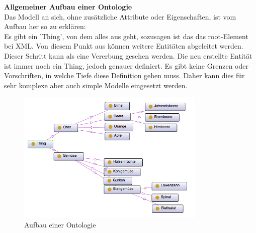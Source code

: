 \textbf{Allgemeiner Aufbau einer Ontologie}\\
Das Modell an sich, ohne zusätzliche Attribute oder Eigenschaften, ist vom Aufbau her so zu erklären:\\
Es gibt ein 'Thing', von dem alles aus geht, sozusagen ist das das root-Element bei \ac{XML}. Von diesem Punkt aus können weitere Entitäten abgeleitet werden. Dieser Schritt kann als eine Vererbung gesehen werden. Die neu erstellte Entität ist immer noch ein Thing, jedoch genauer definiert. Es gibt keine Grenzen oder Vorschriften, in welche Tiefe diese Definition gehen muss. Daher kann dies für sehr komplexe aber auch simple Modelle eingesetzt werden.\\

\begin{figure}[hbt!]
  \centering
  \includegraphics[width=0.8\textwidth]{graphics/stateoftheart/Ontology_example}
  \caption{Aufbau einer Ontologie}
  \label{fig:Ontology_Aufbau}
\end{figure}

